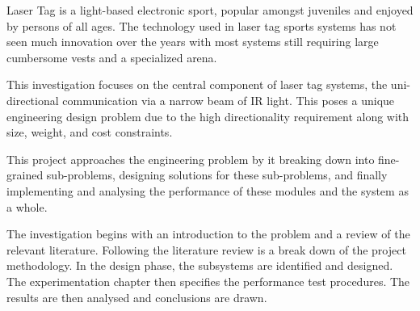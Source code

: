 Laser Tag is a light-based electronic sport, popular amongst juveniles and enjoyed by persons of all ages. The technology used in laser tag sports systems has not seen much innovation over the years with most systems still requiring large cumbersome vests and a specialized arena.

This investigation focuses on the central component of laser tag systems, the uni-directional communication via a narrow beam of IR light. This poses a unique engineering design problem due to the high directionality requirement along with size, weight, and cost constraints.

This project approaches the engineering problem by it breaking down into fine-grained sub-problems, designing solutions for these sub-problems, and finally implementing and analysing the performance of these modules and the system as a whole.

The investigation begins with an introduction to the problem and a review of the relevant literature. Following the literature review is a break down of the project methodology. In the design phase, the subsystems are identified and designed. The experimentation chapter then specifies the performance test procedures. The results are then analysed and conclusions are drawn.
